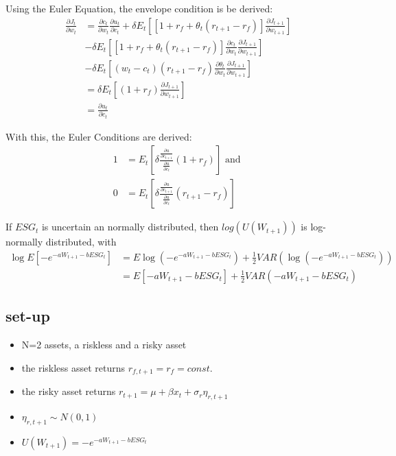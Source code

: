 \documentclass[]{article}
\begin{document}
Using the Euler Equation, the envelope condition is be derived:
\begin{align*}
	\frac{\partial J_t}{\partial w_t} &= \frac{\partial c_t}{\partial w_t} \frac{\partial u_t}{\partial c_t} + \delta E_t \left[\left[1 + r_f + \theta_t(r_{t+1}-r_f) \right]\frac{\partial J_{t+1}}{\partial w_{t+1}}\right]\\
	&- \delta E_t \left[\left[1 + r_f + \theta_t(r_{t+1}-r_f) \right]\frac{\partial c_t}{\partial w_t}\frac{\partial J_{t+1}}{\partial w_{t+1}}\right]\\
	&- \delta E_t\left[(w_t - c_t)(r_{t+1}-r_f)\frac{\partial \theta_t}{\partial w_t}\frac{\partial J_{t+1}}{\partial w_{t+1}}\right]\\
	&= \delta E_t \left[(1 + r_f)\frac{\partial J_{t+1}}{\partial w_{t+1}} \right]\\
	&= \frac{\partial u_t}{\partial c_t}
\end{align*}

With this, the Euler Conditions are derived:
\begin{align*}
	1 &= E_t \left[\delta \frac{\frac{\partial u}{\partial c_{t+1}}}{\frac{\partial u}{\partial c_t}}(1+r_f)\right] \text{ and } \\
	0 &= E_t \left[\delta \frac{\frac{\partial u}{\partial c_{t+1}}}{\frac{\partial u}{\partial c_t}}(r_{t+1} - r_f)\right]
\end{align*}

If $ESG_t$ is uncertain an normally distributed, then $log(U(W_{t+1}))$ is log-normally distributed, with
\begin{align*}
	\log E \left[-e^{-aW_{t+1} - bESG_t}\right] &= E \log(-e^{-aW_{t+1} - bESG_t}) + \frac{1}{2}VAR(\log(-e^{-aW_{t+1} - bESG_t}))\\
	&= E \left[-aW_{t+1} - bESG_t\right] + \frac{1}{2}VAR(-aW_{t+1} - bESG_t)
\end{align*}

\subsection{set-up}
\begin{itemize}
	\item N=2 assets, a riskless and a risky asset
	\item the riskless asset returns $r_{f, t+1} = r_f = const.$
	\item the risky asset returns $r_{t+1} = \mu + \beta x_t + \sigma_r \eta_{r, t+1}$
	\item $\eta_{r, t+1} \sim N(0,1)$
	\item  $U(W_{t+1}) = -e^{-aW_{t+1}-bESG_t}$
\end{itemize}
\end{document}

